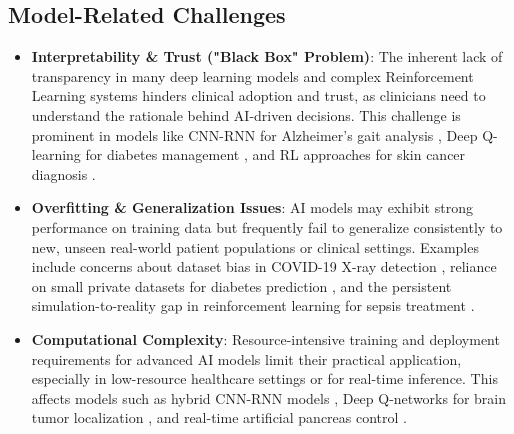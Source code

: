 \documentclass[runningheads]{llncs}
\begin{document}
\subsection{Model-Related Challenges}
\begin{itemize}
    \item \textbf{Interpretability \& Trust ("Black Box" Problem)}: The inherent lack of transparency in many deep learning models and complex Reinforcement Learning systems hinders clinical adoption and trust, as clinicians need to understand the rationale behind AI-driven decisions. This challenge is prominent in models like CNN-RNN for Alzheimer's gait analysis \cite{article_3}, Deep Q-learning for diabetes management \cite{article_11,article_22}, and RL approaches for skin cancer diagnosis \cite{article_11}.
    \item \textbf{Overfitting \& Generalization Issues}: AI models may exhibit strong performance on training data but frequently fail to generalize consistently to new, unseen real-world patient populations or clinical settings. Examples include concerns about dataset bias in COVID-19 X-ray detection \cite{article_23}, reliance on small private datasets for diabetes prediction \cite{article_2}, and the persistent simulation-to-reality gap in reinforcement learning for sepsis treatment \cite{article_13}.
    \item \textbf{Computational Complexity}: Resource-intensive training and deployment requirements for advanced AI models limit their practical application, especially in low-resource healthcare settings or for real-time inference. This affects models such as hybrid CNN-RNN models \cite{article_3}, Deep Q-networks for brain tumor localization \cite{article_12}, and real-time artificial pancreas control \cite{article_22}.
\end{itemize}
\end{document}
